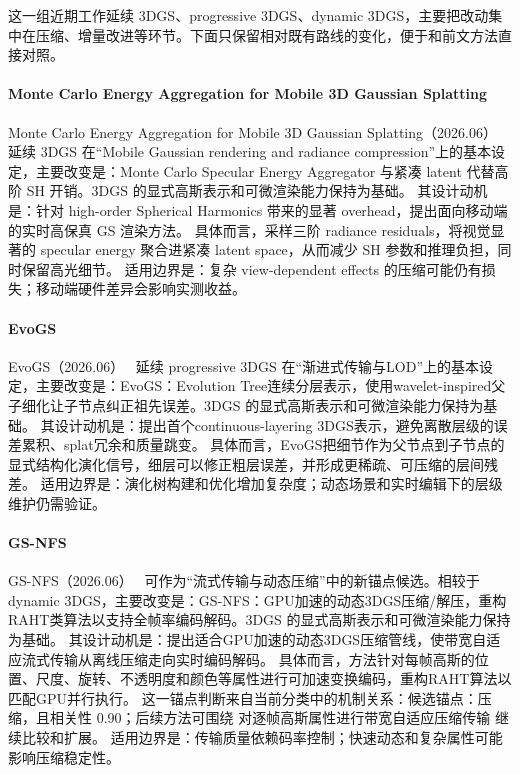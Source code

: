 这一组近期工作延续 3DGS、progressive 3DGS、dynamic 3DGS，主要把改动集中在压缩、增量改进等环节。下面只保留相对既有路线的变化，便于和前文方法直接对照。

\paragraph{Monte Carlo Energy Aggregation for Mobile 3D Gaussian Splatting}
Monte Carlo Energy Aggregation for Mobile 3D Gaussian Splatting（2026.06）~\cite{2606_30017} 延续 3DGS 在“Mobile Gaussian rendering and radiance compression”上的基本设定，主要改变是：Monte Carlo Specular Energy Aggregator 与紧凑 latent 代替高阶 SH 开销。3DGS 的显式高斯表示和可微渲染能力保持为基础。
其设计动机是：针对 high-order Spherical Harmonics 带来的显著 overhead，提出面向移动端的实时高保真 GS 渲染方法。
具体而言，采样三阶 radiance residuals，将视觉显著的 specular energy 聚合进紧凑 latent space，从而减少 SH 参数和推理负担，同时保留高光细节。
适用边界是：复杂 view-dependent effects 的压缩可能仍有损失；移动端硬件差异会影响实测收益。

\paragraph{EvoGS}
EvoGS（2026.06）~\cite{2606_07179} 延续 progressive 3DGS 在“渐进式传输与LOD”上的基本设定，主要改变是：EvoGS：Evolution Tree连续分层表示，使用wavelet-inspired父子细化让子节点纠正祖先误差。3DGS 的显式高斯表示和可微渲染能力保持为基础。
其设计动机是：提出首个continuous-layering 3DGS表示，避免离散层级的误差累积、splat冗余和质量跳变。
具体而言，EvoGS把细节作为父节点到子节点的显式结构化演化信号，细层可以修正粗层误差，并形成更稀疏、可压缩的层间残差。
适用边界是：演化树构建和优化增加复杂度；动态场景和实时编辑下的层级维护仍需验证。

\paragraph{GS-NFS}
GS-NFS（2026.06）~\cite{2606_05650} 可作为“流式传输与动态压缩”中的新锚点候选。相较于 dynamic 3DGS，主要改变是：GS-NFS：GPU加速的动态3DGS压缩/解压，重构RAHT类算法以支持全帧率编码解码。3DGS 的显式高斯表示和可微渲染能力保持为基础。
其设计动机是：提出适合GPU加速的动态3DGS压缩管线，使带宽自适应流式传输从离线压缩走向实时编码解码。
具体而言，方法针对每帧高斯的位置、尺度、旋转、不透明度和颜色等属性进行可加速变换编码，重构RAHT算法以匹配GPU并行执行。
这一锚点判断来自当前分类中的机制关系：候选锚点：压缩，且相关性 0.90；后续方法可围绕 对逐帧高斯属性进行带宽自适应压缩传输 继续比较和扩展。
适用边界是：传输质量依赖码率控制；快速动态和复杂属性可能影响压缩稳定性。
